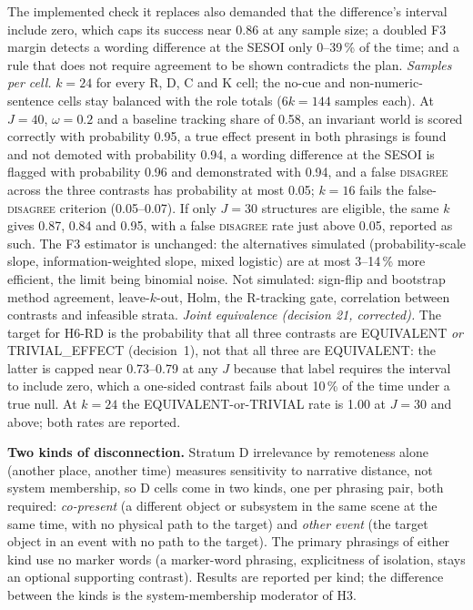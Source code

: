 \documentclass[10pt,a4paper]{article}
\begin{document}
The implemented check it replaces also demanded that the difference's interval include zero, which caps its success near 0.86 at
any sample size; a doubled F3 margin detects a wording difference at the SESOI only 0--39\,\% of the time; and a rule that
does not require agreement to be shown contradicts the plan.
\emph{Samples per cell.} $k=24$ for every R, D, C and K cell; the no-cue and non-numeric-sentence cells stay balanced with
the role totals ($6k=144$ samples each). At $J=40$, $\omega=0.2$ and a baseline tracking share of 0.58, an invariant world is scored correctly with
probability 0.95, a true effect present in both phrasings is found and not demoted with probability 0.94, a wording
difference at the SESOI is flagged with probability 0.96 and demonstrated with 0.94, and a false \textsc{disagree} across the three
contrasts has probability at most 0.05; $k=16$ fails the false-\textsc{disagree} criterion (0.05--0.07). If only $J=30$ structures are
eligible, the same $k$ gives 0.87, 0.84 and 0.95, with a false \textsc{disagree} rate just above 0.05, reported as such. The F3
estimator is unchanged: the alternatives simulated (probability-scale slope, information-weighted slope, mixed logistic) are at most
3--14\,\% more efficient, the limit being binomial noise. Not simulated: sign-flip and bootstrap method agreement, leave-$k$-out, Holm,
the R-tracking gate, correlation between contrasts and infeasible strata.
\emph{Joint equivalence (decision 21, corrected).} The target for H6-RD is the probability that all three contrasts are
EQUIVALENT \emph{or} TRIVIAL\_EFFECT (decision~1), not that all three are EQUIVALENT: the latter is capped near 0.73--0.79 at any $J$ because
that label requires the interval to include zero, which a one-sided contrast fails about 10\,\% of the time under a true null. At $k=24$ the
EQUIVALENT-or-TRIVIAL rate is 1.00 at $J=30$ and above; both rates are reported.

\textbf{Two kinds of disconnection.} Stratum D irrelevance by remoteness alone (another place, another time) measures
sensitivity to narrative distance, not system membership, so D cells come in two kinds, one per phrasing pair, both
required: \emph{co-present} (a different object or subsystem in the same scene at the same time, with no physical path to
the target) and \emph{other event} (the target object in an event with no path to the target). The primary phrasings of
either kind use no marker words (a marker-word phrasing, explicitness of isolation, stays an optional supporting contrast). Results are reported per kind; the difference between the kinds is the system-membership moderator of H3.
\end{document}
